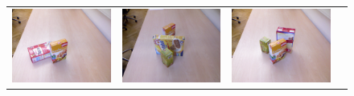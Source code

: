\documentclass[10pt,twocolumn,letterpaper]{article}
\begin{document}
\newcommand{\scenewidth}{0.48\columnwidth}
\newcommand{\topc}{30}
\begin{figure}
    \begin{tabular}{cccc}
    \includegraphics[width=\scenewidth]{scene/image_color/learn12} &
    \includegraphics[width=\scenewidth]{scene/image_color/test11} &
    \includegraphics[width=\scenewidth]{scene/image_color/learn13} &

\end{tabular}
\end{figure}
\end{document}
